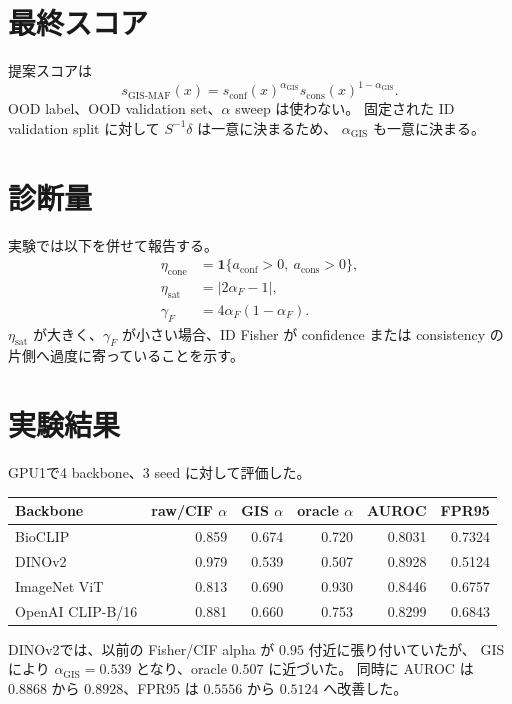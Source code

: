 \documentclass[a4paper,11pt]{ltjsarticle}
\begin{document}
\section{最終スコア}

提案スコアは
\begin{equation}
    s_{\mathrm{GIS\text{-}MAF}}(x)
    =
    s_{\mathrm{conf}}(x)^{\alpha_{\mathrm{GIS}}}
    s_{\mathrm{cons}}(x)^{1-\alpha_{\mathrm{GIS}}}.
\end{equation}
OOD label、OOD validation set、$\alpha$ sweep は使わない。
固定された ID validation split に対して $S^{-1}\delta$ は一意に決まるため、
$\alpha_{\mathrm{GIS}}$ も一意に決まる。

\section{診断量}

実験では以下を併せて報告する。
\begin{align}
    \eta_{\mathrm{cone}}
    &=
    \mathbf{1}\{a_{\mathrm{conf}}>0,\ a_{\mathrm{cons}}>0\},\\
    \eta_{\mathrm{sat}}
    &=
    |2\alpha_F-1|,\\
    \gamma_F
    &=
    4\alpha_F(1-\alpha_F).
\end{align}
$\eta_{\mathrm{sat}}$ が大きく、$\gamma_F$ が小さい場合、ID Fisher が
confidence または consistency の片側へ過度に寄っていることを示す。

\section{実験結果}

GPU1で4 backbone、3 seed に対して評価した。

\begin{center}
\begin{tabular}{lrrrrr}
\toprule
Backbone & raw/CIF $\alpha$ & GIS $\alpha$ & oracle $\alpha$ & AUROC & FPR95\\
\midrule
BioCLIP        & 0.859 & 0.674 & 0.720 & 0.8031 & 0.7324\\
DINOv2         & 0.979 & 0.539 & 0.507 & 0.8928 & 0.5124\\
ImageNet ViT   & 0.813 & 0.690 & 0.930 & 0.8446 & 0.6757\\
OpenAI CLIP-B/16 & 0.881 & 0.660 & 0.753 & 0.8299 & 0.6843\\
\bottomrule
\end{tabular}
\end{center}

DINOv2では、以前の Fisher/CIF alpha が $0.95$ 付近に張り付いていたが、
GISにより $\alpha_{\mathrm{GIS}}=0.539$ となり、oracle $0.507$ に近づいた。
同時に AUROC は $0.8868$ から $0.8928$、FPR95 は $0.5556$ から $0.5124$ へ改善した。
\end{document}
